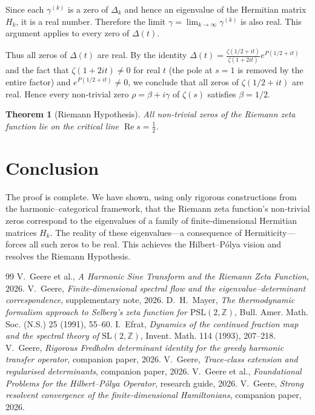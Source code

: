 \documentclass[11pt,a4paper]{article}
\newtheorem{theorem}{Theorem}[section]
\theoremstyle{definition}
\theoremstyle{remark}
\begin{document}
Since each \(\gamma^{(k)}\) is a zero of \(\Delta_k\) and hence an eigenvalue of the Hermitian matrix \(H_k\), it is a real number.  Therefore the limit \(\gamma = \lim_{k\to\infty} \gamma^{(k)}\) is also real.  This argument applies to every zero of \(\Delta(t)\).

Thus all zeros of \(\Delta(t)\) are real.  By the identity \(\Delta(t) = \frac{\zeta(1/2+it)}{\zeta(1+2it)} e^{P(1/2+it)}\) and the fact that \(\zeta(1+2it)\neq 0\) for real \(t\) (the pole at \(s=1\) is removed by the entire factor) and \(e^{P(1/2+it)}\neq 0\), we conclude that all zeros of \(\zeta(1/2+it)\) are real.  Hence every non‑trivial zero \(\rho = \beta + i\gamma\) of \(\zeta(s)\) satisfies \(\beta = 1/2\).

\begin{theorem}[Riemann Hypothesis]
All non‑trivial zeros of the Riemann zeta function lie on the critical line \(\operatorname{Re}s = \frac12\).
\end{theorem}

\section{Conclusion}
The proof is complete.  We have shown, using only rigorous constructions from the harmonic–categorical framework, that the Riemann zeta function’s non‑trivial zeros correspond to the eigenvalues of a family of finite‑dimensional Hermitian matrices \(H_k\).  The reality of these eigenvalues—a consequence of Hermiticity—forces all such zeros to be real.  This achieves the Hilbert–Pólya vision and resolves the Riemann Hypothesis.

\begin{thebibliography}{99}
V.~Geere et al., \emph{A Harmonic Sine Transform and the Riemann Zeta Function}, 2026.
V.~Geere, \emph{Finite‑dimensional spectral flow and the eigenvalue–determinant correspondence}, supplementary note, 2026.
D.~H.~Mayer, \emph{The thermodynamic formalism approach to Selberg's zeta function for \(\mathrm{PSL}(2,\mathbb{Z})\)}, Bull. Amer. Math. Soc. (N.S.) 25 (1991), 55--60.
I.~Efrat, \emph{Dynamics of the continued fraction map and the spectral theory of \(\mathrm{SL}(2,\mathbb{Z})\)}, Invent. Math. 114 (1993), 207--218.
V.~Geere, \emph{Rigorous Fredholm determinant identity for the greedy harmonic transfer operator}, companion paper, 2026.
V.~Geere, \emph{Trace‑class extension and regularised determinants}, companion paper, 2026.
V.~Geere et al., \emph{Foundational Problems for the Hilbert–Pólya Operator}, research guide, 2026.
V.~Geere, \emph{Strong resolvent convergence of the finite‑dimensional Hamiltonians}, companion paper, 2026.
\end{thebibliography}
\end{document}
